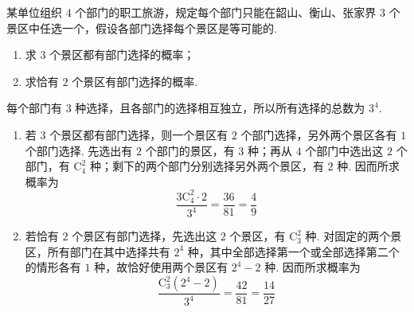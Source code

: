 \begin{problem}
某单位组织 \(4\) 个部门的职工旅游，规定每个部门只能在韶山、衡山、张家界 \(3\) 个景区中任选一个，假设各部门选择每个景区是等可能的.

\begin{enumerate}
\item 求 \(3\) 个景区都有部门选择的概率；
\item 求恰有 \(2\) 个景区有部门选择的概率.
\end{enumerate}

\begin{solution}
每个部门有 \(3\) 种选择，且各部门的选择相互独立，所以所有选择的总数为
\(3^4\).

\begin{enumerate}
\item 若 \(3\) 个景区都有部门选择，则一个景区有 \(2\) 个部门选择，另外两个景区各有 \(1\) 个部门选择. 先选出有 \(2\) 个部门的景区，有 \(3\) 种；再从 \(4\) 个部门中选出这 \(2\) 个部门，有 \(\mathrm C_4^2\) 种；剩下的两个部门分别选择另外两个景区，有 \(2\) 种. 因而所求概率为
\[
\frac{3\mathrm C_4^2\cdot2}{3^4}=\frac{36}{81}=\frac{4}{9}
\]
\item 若恰有 \(2\) 个景区有部门选择，先选出这 \(2\) 个景区，有 \(\mathrm C_3^2\) 种. 对固定的两个景区，所有部门在其中选择共有 \(2^4\) 种，其中全部选择第一个或全部选择第二个的情形各有 \(1\) 种，故恰好使用两个景区有 \(2^4-2\) 种. 因而所求概率为
\[
\frac{\mathrm C_3^2(2^4-2)}{3^4}=\frac{42}{81}=\frac{14}{27}
\]
\end{enumerate}
\end{solution}
\end{problem}

